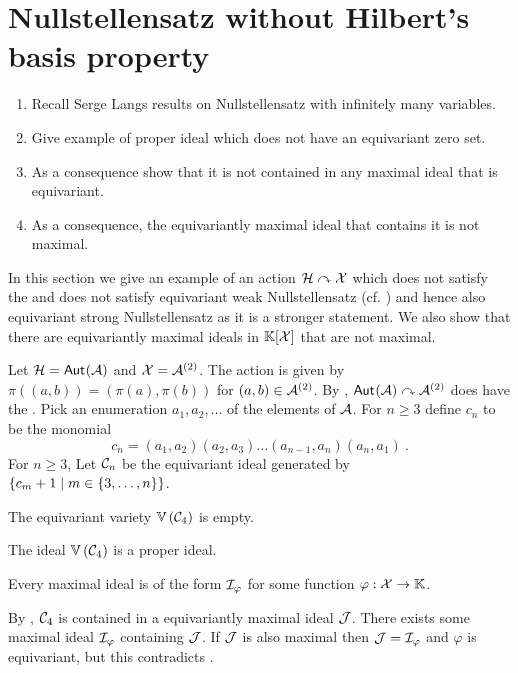 %
\section{Nullstellensatz without Hilbert's basis property}
%
\begin{enumerate}
    \item Recall Serge Langs results on Nullstellensatz with infinitely many variables.
    \item Give example of proper ideal which does not have an equivariant zero set.
    \item As a consequence show that it is not contained in any maximal ideal that is equivariant.
    \item As a consequence, the equivariantly maximal ideal that contains it is not maximal.
\end{enumerate}
%
In this section we give an example of an action $\mathcal{H}\curvearrowright\mathcal{X}$ which does not satisfy the  and does not satisfy equivariant weak Nullstellensatz (cf. ) and hence also equivariant strong Nullstellensatz as it is a stronger statement.
We also show that there are equivariantly maximal ideals in $\mathbb{K}[\mathcal{X}]$ that are not maximal. 
%

Let $\mathcal{H} = \mathsf{Aut}_{}{(\mathcal{A})}$ and $\mathcal{X} = \mathcal{A}^{(2)}$.
The action is given by
$\pi((a,b)) = (\pi(a),\pi(b))$ for $(a,b)\in\mathcal{A}^{(2)}$.
By ,
$\mathsf{Aut}_{}{(\mathcal{A})}\curvearrowright\mathcal{A}^{(2)}$ does have the .
Pick an enumeration $a_1,a_2,\dots$ of the elements of $\mathcal{A}$.
For $n \geq 3$ define $c_n$ to be the monomial
\[
c_n = (a_1,a_2)(a_2,a_3)\dots (a_{n-1},a_n)(a_n,a_1) \ .
\]
For $n\geq 3$, Let $\idl[C]_n$ be the equivariant ideal generated by $\{ c_m + 1 \mid m\in\{ 3,\dots,n \} \}$.
%
\begin{lemma}\label{lem:C4 no equiv zero}
    The equivariant variety $\zeros{\idl[C]_4}$ is empty.
\end{lemma}
%
\begin{lemma}\label{lem:C4 proper}
    The ideal $\zeros{\idl[C]_4}$ is a proper ideal.
\end{lemma}
%

%
\begin{lemma}
    Every maximal ideal is of the form $\idl[I]_{\varphi}$ for some function $\varphi : \mathcal{X} \to \mathbb{K}$.
\end{lemma}
%
By , $\idl[C]_4$ is contained in a equivariantly maximal ideal $\idl[J]$.
There exists some maximal ideal $\idl[I]_{\varphi}$ containing $\idl[J]$.
If $\idl[J]$ is also maximal then $\idl[J] = \idl[I]_{\varphi}$ and $\varphi$ is equivariant,
but this contradicts .
%